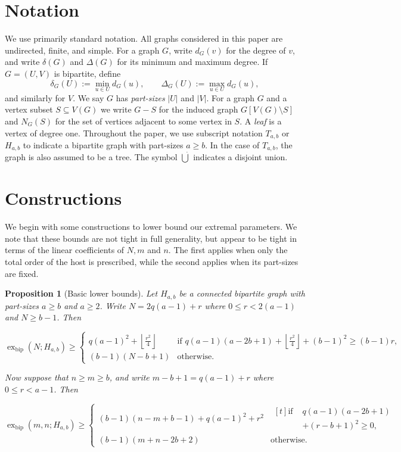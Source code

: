 \documentclass[12pt]{article}
\newtheorem{proposition}[theorem]{Proposition}
\theoremstyle{definition}
\theoremstyle{remark}
\newcommand{\exbip}{\operatorname{ex}_{\mathrm{bip}}}
\begin{document}
\section{Notation}
\label{sec:notation}

We use primarily standard notation. All graphs considered in this paper are undirected, finite, and simple. For a graph $G$, write $d_G(v)$ for the degree of $v$, and write $\delta(G)$ and $\Delta(G)$ for its minimum and maximum degree. If $G=(U,V)$ is bipartite, define
\[
    \delta_G(U):=\min_{u\in U}d_G(u),
    \qquad
    \Delta_G(U):=\max_{u\in U}d_G(u),
\]
and similarly for $V$. We  say $G$ has \emph{part-sizes} $|U|$ and $|V|$. For a graph $G$ and a vertex subset $S\subseteq V(G)$ we write $G-S$ for the induced graph $G[V(G)\setminus S]$ and $N_G(S)$ for the set of vertices adjacent to some vertex in $S$. A \emph{leaf} is a vertex of degree one. Throughout the paper, we use subscript notation $T_{a,b}$ or $H_{a,b}$ to indicate a bipartite graph with part-sizes $a\geq b$. In the case of $T_{a,b}$, the graph is also assumed to be a tree. The symbol $\dot\bigcup$ indicates a disjoint union.
\section{Constructions}
\label{sec:constructions}

We begin with some constructions to lower bound our extremal parameters. We note that these bounds are not tight in full generality, but appear to be tight in terms of the linear coefficients of $N,m$ and $n$. The first applies when only the total order of the host is prescribed, while the second applies when its part-sizes are fixed.

\begin{proposition}[Basic lower bounds]
\label{prop:lower-bounds}
Let \(H_{a,b}\) be a connected bipartite graph with part-sizes \(a\geq b\) and \(a\geq2\). Write $N=2q(a-1)+r$ where $0\leq r<2(a-1)$ and $N\geq b-1$. Then

\[
\exbip(N;H_{a,b}) \geq
\begin{cases}
q(a-1)^2+\left\lfloor\frac{r^2}{4}\right\rfloor &\text{if } q(a-1)(a-2b+1)+\left\lfloor\frac{r^2}{4}\right\rfloor+(b-1)^2\geq (b-1)r,\\[3mm]
(b-1)(N-b+1)&\text{otherwise}.
\end{cases}
\]

\noindent Now suppose that \(n\geq m\geq b\), and write $m-b+1=q(a-1)+r$ where $0\leq r<a-1$. Then

\[
\exbip(m,n;H_{a,b})\ge
\begin{cases}
(b-1)(n-m+b-1)+q(a-1)^2+r^2
&
\begin{aligned}[t]
\text{if }&
q(a-1)(a-2b+1)\\
&+(r-b+1)^2\ge0,
\end{aligned}
\\[3mm]
(b-1)(m+n-2b+2)
&
\text{otherwise.}
\end{cases}
\]
\end{proposition}
\end{document}

